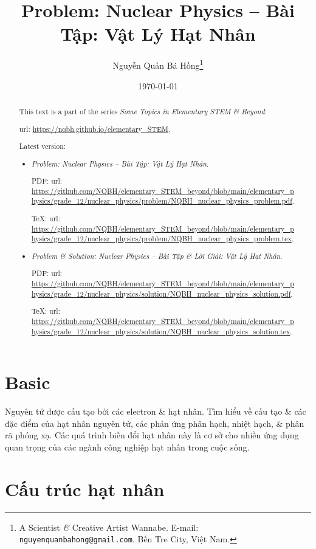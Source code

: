 \documentclass{article}
\title{Problem: Nuclear Physics -- Bài Tập: Vật Lý Hạt Nhân}
\author{Nguyễn Quản Bá Hồng\footnote{A Scientist {\it\&} Creative Artist Wannabe. E-mail: {\tt nguyenquanbahong@gmail.com}. Bến Tre City, Việt Nam.}}
\date{\today}
\begin{document}
\maketitle
\begin{abstract}
	This text is a part of the series {\it Some Topics in Elementary STEM \& Beyond}:
	
	{\sc url}: \url{https://nqbh.github.io/elementary_STEM}.
	
	Latest version:
	\begin{itemize}
		\item {\it Problem: Nuclear Physics -- Bài Tập: Vật Lý Hạt Nhân}.
		
		PDF: {\sc url}: \url{https://github.com/NQBH/elementary_STEM_beyond/blob/main/elementary_physics/grade_12/nuclear_physics/problem/NQBH_nuclear_physics_problem.pdf}.
		
		\TeX: {\sc url}: \url{https://github.com/NQBH/elementary_STEM_beyond/blob/main/elementary_physics/grade_12/nuclear_physics/problem/NQBH_nuclear_physics_problem.tex}.
		\item {\it Problem \& Solution: Nuclear Physics -- Bài Tập \& Lời Giải: Vật Lý Hạt Nhân}.
		
		PDF: {\sc url}: \url{https://github.com/NQBH/elementary_STEM_beyond/blob/main/elementary_physics/grade_12/nuclear_physics/solution/NQBH_nuclear_physics_solution.pdf}.
		
		\TeX: {\sc url}: \url{https://github.com/NQBH/elementary_STEM_beyond/blob/main/elementary_physics/grade_12/nuclear_physics/solution/NQBH_nuclear_physics_solution.tex}.
	\end{itemize}
\end{abstract}
\tableofcontents


\section{Basic}
Nguyên tử được cấu tạo bởi các electron \& hạt nhân. Tìm hiểu về cấu tạo \& các đặc điểm của hạt nhân nguyên tử, các phản ứng phân hạch, nhiệt hạch, \& phân rã phóng xạ. Các quá trình biến đổi hạt nhân này là cơ sở cho nhiều ứng dụng quan trọng của các ngành công nghiệp hạt nhân trong cuộc sống.


\section{Cấu trúc hạt nhân}
\end{document}
